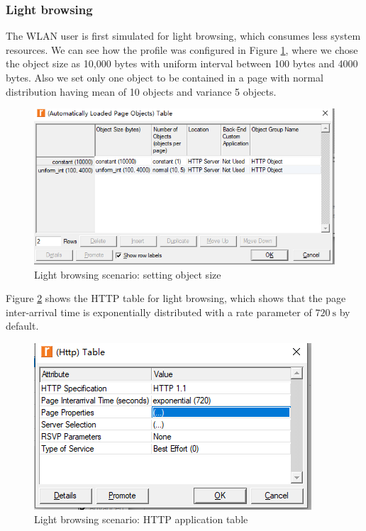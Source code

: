 \subsubsection{Light browsing} \label{subsubsec:light}
The \gls{WLAN} user is first simulated for light browsing, which consumes less system resources. We can see how the profile was configured in Figure \ref{fig:simul:riverbed:light:1}, where we chose the object size as 10,000 bytes with uniform interval between 100 bytes and 4000 bytes. Also we set only one object to be contained in a page  with normal distribution having mean of 10 objects and variance 5 objects. 

\begin{figure}[H]
	\centering
	\includegraphics[scale=0.54]{Figures/amantianrenamed/ScenariooneLightbrowsingobjectsize.png}
	\caption{Light browsing scenario: setting object size}
	\label{fig:simul:riverbed:light:1}
\end{figure}

Figure \ref{fig:simul:riverbed:light:2} shows the \gls{HTTP} table for light browsing, which shows that the page inter-arrival time is exponentially distributed with a rate parameter of $720~\mathrm{s}$ by default.
\begin{figure}[H]
	\centering
	\includegraphics[scale=0.62]{Figures/amantianrenamed/ScenariooneHttpapplicationtableforlightbrowsing.png}
	\caption[Light browsing scenario: HTTP application table]{Light browsing scenario: \gls{HTTP} application table}
	\label{fig:simul:riverbed:light:2}
\end{figure}

